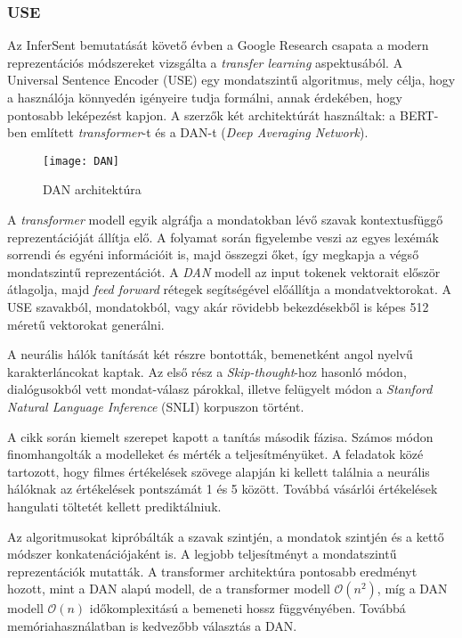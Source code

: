 \subsubsection{USE}
Az InferSent bemutatását követő évben a Google Research csapata a modern reprezentációs módszereket vizsgálta a \textit{transfer learning} aspektusából. A Universal Sentence Encoder (USE) \cite{use} egy mondatszintű  algoritmus, mely célja, hogy a használója könnyedén igényeire tudja formálni, annak érdekében, hogy pontosabb leképezést kapjon. A szerzők két architektúrát használtak: a BERT-ben említett \textit{transformer}-t és a DAN-t (\textit{Deep Averaging Network}). 

\begin{figure}[H]
	\centering
	\texttt{[image: DAN]}
	\caption{DAN architektúra}
\end{figure}

A \textit{transformer} modell egyik algráfja a mondatokban lévő szavak kontextusfüggő reprezentációját állítja elő. A folyamat során figyelembe veszi az egyes lexémák sorrendi és egyéni információit is, majd összegzi őket, így megkapja a végső mondatszintű reprezentációt.
A \textit{DAN} modell az input tokenek vektorait először átlagolja, majd \textit{feed forward} rétegek segítségével előállítja a mondatvektorokat. A USE szavakból, mondatokból, vagy akár rövidebb bekezdésekből is képes 512 méretű vektorokat generálni.

A neurális hálók tanítását két részre bontották, bemenetként angol nyelvű karakterláncokat kaptak. Az első rész a \textit{Skip-thought}-hoz hasonló módon, dialógusokból vett mondat-válasz párokkal, illetve felügyelt módon a \textit{Stanford Natural Language Inference} (SNLI) korpuszon történt.

A cikk során kiemelt szerepet kapott a tanítás második fázisa. Számos módon finomhangolták a modelleket és mérték a teljesítményüket. A feladatok közé tartozott, hogy filmes értékelések szövege alapján ki kellett találnia a neurális hálóknak az értékelések pontszámát 1 és 5 között. Továbbá vásárlói értékelések hangulati töltetét kellett prediktálniuk.

 Az algoritmusokat kipróbálták a szavak szintjén, a mondatok szintjén és a kettő módszer konkatenációjaként is. A legjobb teljesítményt a mondatszintű reprezentációk mutatták. A transformer architektúra pontosabb eredményt hozott, mint a DAN alapú modell, de a transformer modell $\mathcal{O}(n^2)$, míg a DAN modell $\mathcal{O}(n)$ időkomplexitású a bemeneti hossz függvényében. Továbbá memóriahasználatban is kedvezőbb választás a DAN.

